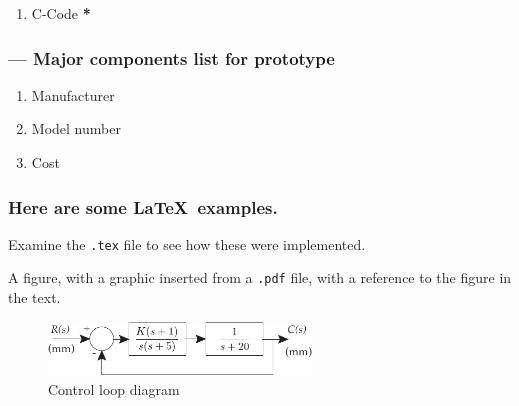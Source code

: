 \documentclass[twocolumn]{article}
\begin{document}
\begin{enumerate}
\begin{enumerate}
\begin{verbatim}
HeaderFileName = ...
'Users\Jeff\Documents\Capstone...
\ImpedanceCapstone\ControllerHeader.h';
%-----continuous:
%---Sampling freq for discrete filter
fs=2000;        
T=1/fs;         %---Sampling period
s = tf('s');
PI = Kp + Ki/s;
sPI = series(plant,PI);
%-----discrete equivalent:
plantd=c2d(plant,T,'tustin');
PId=c2d(PI,T,'tustin');
sPId=series(plantd,PId);

%---Biquad Cascade
% SOS is an L by 6 matrix with the 
% following structure:
%         SOS = [ b01 b11 b21  1 a11 a21  
%                 b02 b12 b22  1 a12 a22
%                 ...
%                 b0L b1L b2L  1 a1L a2L ]
%---get discrete system coefficients
[b,a]=tfdata(PId,'v');      
%---convert to biquads 
[sos,gain]=tf2sos(b,a);     
[ns,n]=size(sos);
for j=1:3                   
%---Apply the gain to the final biquad
sos(ns,j)=gain*sos(ns,j);
end

if PrintToFile
fid=fopen(HeaderFileName,'W');    
else
fid=1;   
end

%---Structure for cascade
comment=['PI controller'];
PrintToBiquadFHeaderFile(fid,...
 sos, 'myFilter', T, comment);

if fid~=1
fclose(fid);
end 
return
\end{verbatim}
\end{enumerate}
\item{C-Code} {\color{red}\bf{*}}
\end{enumerate}
\subsubsection*{ --- Major components list for prototype}
\begin{enumerate}
\item{Manufacturer}
\item{Model number}
\item{Cost}
\end{enumerate}

\newpage
\subsubsection*{Here are some \LaTeX\ examples.} 

Examine the \verb|.tex| file to see how these were implemented.

\vspace{.167in}
A figure, with a graphic inserted from a \verb|.pdf| file, with a reference to the figure in the text.
\begin{figure}[htbp]
\begin{center}
\includegraphics[width=2.75in]{ControlLoop2.pdf}
\caption{Control loop diagram}
\label{ControlLoop}
\end{center}
\end{figure}
\end{document}
